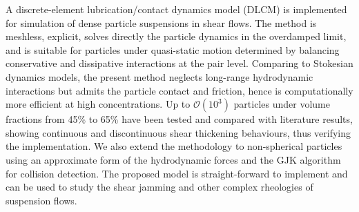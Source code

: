 \begin{paper}

\makepapertitle

%
\begin{paperabstract}
	A discrete-element lubrication/contact dynamics model (DLCM) is implemented for simulation of dense particle suspensions in shear flows. The method is meshless, explicit, solves directly the particle dynamics in the overdamped limit, and is suitable for particles under quasi-static motion determined by balancing conservative and dissipative interactions at the pair level. Comparing to Stokesian dynamics models, the present method neglects long-range hydrodynamic interactions but admits the particle contact and friction, hence is computationally more efficient at high concentrations. Up to $\mathcal{O}(10^3)$ particles under volume fractions from 45\% to 65\% have been tested and compared with literature results, showing continuous and discontinuous shear thickening behaviours, thus verifying the implementation. We also extend the methodology to non-spherical particles using an approximate form of the hydrodynamic forces and the GJK algorithm for collision detection. The proposed model is straight-forward to implement and can be used to study the shear jamming and other complex rheologies of suspension flows.

\end{paperabstract}


%



%


%


\end{paper}
